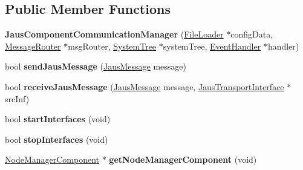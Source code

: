 \subsection*{\-Public \-Member \-Functions}
\begin{DoxyCompactItemize}
\item 
\hypertarget{class_jaus_component_communication_manager_a2167f26463699fd3b673e0f8dd73df88}{{\bfseries \-Jaus\-Component\-Communication\-Manager} (\hyperlink{class_file_loader}{\-File\-Loader} $\ast$config\-Data, \hyperlink{class_message_router}{\-Message\-Router} $\ast$msg\-Router, \hyperlink{class_system_tree}{\-System\-Tree} $\ast$system\-Tree, \hyperlink{class_event_handler}{\-Event\-Handler} $\ast$handler)}\label{class_jaus_component_communication_manager_a2167f26463699fd3b673e0f8dd73df88}

\item 
\hypertarget{class_jaus_component_communication_manager_aa8fb0f4a257249e99d98b0c957e9679c}{bool {\bfseries send\-Jaus\-Message} (\hyperlink{struct_jaus_message_struct}{\-Jaus\-Message} message)}\label{class_jaus_component_communication_manager_aa8fb0f4a257249e99d98b0c957e9679c}

\item 
\hypertarget{class_jaus_component_communication_manager_a890a87c58baba1b6e57898dd868f9f1f}{bool {\bfseries receive\-Jaus\-Message} (\hyperlink{struct_jaus_message_struct}{\-Jaus\-Message} message, \hyperlink{class_jaus_transport_interface}{\-Jaus\-Transport\-Interface} $\ast$src\-Inf)}\label{class_jaus_component_communication_manager_a890a87c58baba1b6e57898dd868f9f1f}

\item 
\hypertarget{class_jaus_component_communication_manager_a46826fb0ffda03ac98e6f98215fd8dda}{bool {\bfseries start\-Interfaces} (void)}\label{class_jaus_component_communication_manager_a46826fb0ffda03ac98e6f98215fd8dda}

\item 
\hypertarget{class_jaus_component_communication_manager_a07a16b7eb766c6e15966d6e522518c7d}{bool {\bfseries stop\-Interfaces} (void)}\label{class_jaus_component_communication_manager_a07a16b7eb766c6e15966d6e522518c7d}

\item 
\hypertarget{class_jaus_component_communication_manager_ad88e9167c99985641562fe7abd07e4da}{\hyperlink{class_node_manager_component}{\-Node\-Manager\-Component} $\ast$ {\bfseries get\-Node\-Manager\-Component} (void)}\label{class_jaus_component_communication_manager_ad88e9167c99985641562fe7abd07e4da}

\end{DoxyCompactItemize}
